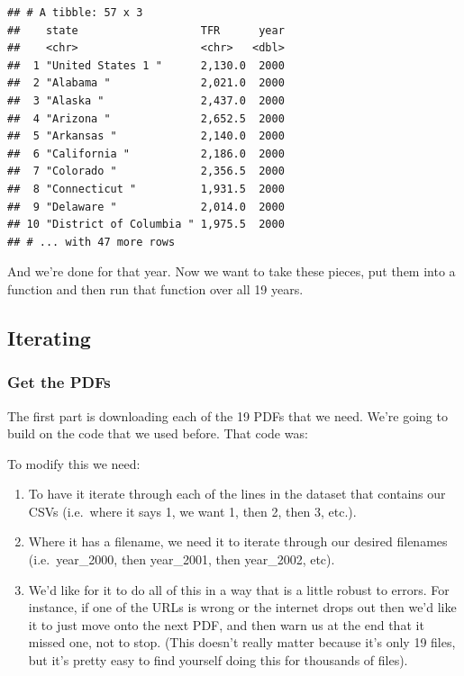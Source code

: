 \documentclass[
]{book}
\newenvironment{Shaded}{\begin{snugshade}}{\end{snugshade}}
\newcommand{\DataTypeTok}[1]{\textcolor[rgb]{0.13,0.29,0.53}{#1}}
\newcommand{\DecValTok}[1]{\textcolor[rgb]{0.00,0.00,0.81}{#1}}
\newcommand{\KeywordTok}[1]{\textcolor[rgb]{0.13,0.29,0.53}{\textbf{#1}}}
\newcommand{\NormalTok}[1]{#1}
\newcommand{\OperatorTok}[1]{\textcolor[rgb]{0.81,0.36,0.00}{\textbf{#1}}}
\newcommand{\StringTok}[1]{\textcolor[rgb]{0.31,0.60,0.02}{#1}}
\providecommand{\tightlist}{%
  \setlength{\itemsep}{0pt}\setlength{\parskip}{0pt}}
\begin{document}
\begin{verbatim}
## # A tibble: 57 x 3
##    state                   TFR      year
##    <chr>                   <chr>   <dbl>
##  1 "United States 1 "      2,130.0  2000
##  2 "Alabama "              2,021.0  2000
##  3 "Alaska "               2,437.0  2000
##  4 "Arizona "              2,652.5  2000
##  5 "Arkansas "             2,140.0  2000
##  6 "California "           2,186.0  2000
##  7 "Colorado "             2,356.5  2000
##  8 "Connecticut "          1,931.5  2000
##  9 "Delaware "             2,014.0  2000
## 10 "District of Columbia " 1,975.5  2000
## # ... with 47 more rows
\end{verbatim}

And we're done for that year. Now we want to take these pieces, put them into a function and then run that function over all 19 years.

\hypertarget{iterating}{%
\subsection{Iterating}\label{iterating}}

\hypertarget{get-the-pdfs}{%
\subsubsection{Get the PDFs}\label{get-the-pdfs}}

The first part is downloading each of the 19 PDFs that we need. We're going to build on the code that we used before. That code was:

\begin{Shaded}
\end{Shaded}

To modify this we need:

\begin{enumerate}
\def\labelenumi{\arabic{enumi}.}
\tightlist
\item
  To have it iterate through each of the lines in the dataset that contains our CSVs (i.e.~where it says 1, we want 1, then 2, then 3, etc.).
\item
  Where it has a filename, we need it to iterate through our desired filenames (i.e.~year\_2000, then year\_2001, then year\_2002, etc).
\item
  We'd like for it to do all of this in a way that is a little robust to errors. For instance, if one of the URLs is wrong or the internet drops out then we'd like it to just move onto the next PDF, and then warn us at the end that it missed one, not to stop. (This doesn't really matter because it's only 19 files, but it's pretty easy to find yourself doing this for thousands of files).
\end{enumerate}
\end{document}

